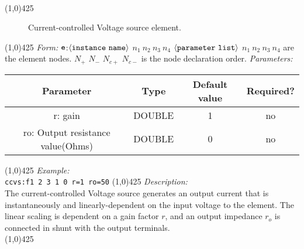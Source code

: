 \documentclass{article}
\begin{document}
\\
\hrulefill \linethickness{0.5mm}\line(1,0){425}
\normalsize
\newline
\begin{figure}[htp]
\centerline{\epsfxsize=2in}
\caption{Current-controlled Voltage source element.}
\end{figure}
\newline
\linethickness{0.5mm} \line(1,0){425}
\newline
\textit{Form:}
\newline
$\tt e$:$\langle \tt{instance\ name}\rangle$ $n_1\ n_2\ n_3\ n_4$
$\langle \tt{parameter\ list}\rangle$
\newline
$n_1\ n_2\ n_3\ n_4$ are the element nodes.
\newline
$N_+$ $N_-$ $N_{c+}$ $N_{c-}$ is the node declaration order.
\newline
\textit{Parameters:}
\begin{table}[H]
\begin{tabular}{|c|c|c|c|}
\hline
Parameter&Type&Default value&Required?\\
\hline
r: gain & DOUBLE & 1 & no\\
\hline
ro: Output resistance value(Ohms) & DOUBLE & 0 & no\\
\hline
\end{tabular}
\end{table}
\linethickness{0.5mm} \line(1,0){425}
\newline
\textit{Example:}\\
\newline
\texttt{ccvs:f1 2 3 1 0 r=1 ro=50}
\newline
\linethickness{0.5mm} \line(1,0){425}
\newline
\textit{Description:}\\
The current-controlled Voltage source generates an output current
that is instantaneously and linearly-dependent on the input
voltage to the element.  The linear scaling is dependent on a
gain factor $r$, and an output impedance $r_o$ is connected in
shunt with the output terminals.\\
\newline
\linethickness{0.5mm} \line(1,0){425}
\newline
\end{document}
